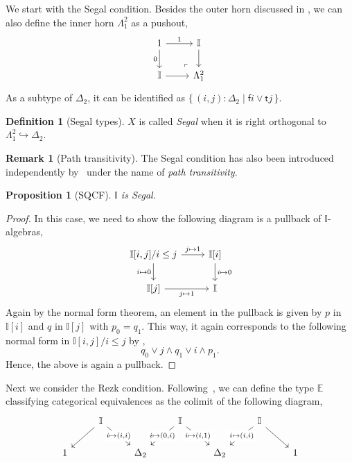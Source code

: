 \documentclass[a4paper,12pt]{amsart}
\newtheorem{proposition}[theorem]{Proposition}
\theoremstyle{definition}
\newtheorem{definition}[theorem]{Definition}
\newtheorem{remark}[theorem]{Remark}
\newcommand{\mbb}[1]{\mathbb{#1}}
\newcommand{\I}{\mbb I}
\newcommand{\ms}[1]{\mathsf{#1}}
\newcommand{\scomp}[2]{\{\,#1\mid#2\,\}}
\newcommand{\hook}{\hookrightarrow}
\begin{document}
We start with the Segal condition. Besides the outer horn discussed in , we can also define the inner horn $\Lambda^2_1$ as a pushout,
\[
  \begin{tikzcd}
    1 \ar[d, "0"'] \ar[r, "1"] & \I \ar[d] \\
    \I \ar[r] & \Lambda^2_1
    \arrow["\lrcorner"{anchor=center, pos=0.125, rotate=180}, draw=none, from=2-2, to=1-1]
  \end{tikzcd}
\]
As a subtype of $\Delta_2$, it can be identified as $\scomp{(i,j) : \Delta_2}{\ms fi \vee \ms tj}$.

\begin{definition}[Segal types]
  $X$ is called \emph{Segal} when it is right orthogonal to $\Lambda^2_1 \hook \Delta_2$.
\end{definition}

\begin{remark}[Path transitivity]
  The Segal condition has also been introduced independently by~\citet{fiore2001domains} under the name of \emph{path transitivity}.
\end{remark}

\begin{proposition}[SQCF]
  $\I$ is Segal.
\end{proposition}
\begin{proof}
  In this case, we need to show the following diagram is a pullback of $\I$-algebras, 
  \[
  \begin{tikzcd}
    \I[i,j]/i\le j \ar[r, "j \mapsto 1"] \ar[d, "i \mapsto 0"'] & \I[i] \ar[d, "i \mapsto 0"] \\
    \I[j] \ar[r, "j \mapsto 1"'] & \I
  \end{tikzcd}
  \]
  Again by the normal form theorem, an element in the pullback is given by $p$ in $\I[i]$ and $q$ in $\I[j]$ with $p_0 = q_1$. This way, it again corresponds to the following normal form in $\I[i,j]/i \le j$ by ,
  \[ q_0 \vee j \wedge q_1 \vee i \wedge p_1. \]
  Hence, the above is again a pullback.
\end{proof}

Next we consider the Rezk condition. Following~\cite{buchholtz2021synthetic}, we can define the type $\mbb E$ classifying categorical equivalences as the colimit of the following diagram,
\[
\begin{tikzcd}
	& \I && \I && \I \\
	1 && {\Delta_2} && {\Delta_2} && 1
	\arrow[from=1-2, to=2-1]
	\arrow["{i \mapsto (i,i)}"{description}, from=1-2, to=2-3]
	\arrow["{i \mapsto (0,i)}"{description}, from=1-4, to=2-3]
	\arrow["{i \mapsto (i,1)}"{description}, from=1-4, to=2-5]
	\arrow["{i \mapsto (i,i)}"{description}, from=1-6, to=2-5]
	\arrow[from=1-6, to=2-7]
\end{tikzcd}
\]
\end{document}
